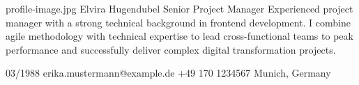 \documentclass[11pt, a4paper]{article}
\begin{document}
\personalheaderwithimage
  {profile-image.jpg}
  {Elvira Hugendubel}
  {Senior Project Manager}
  {Experienced project manager with a strong technical background in
   frontend development. I combine agile methodology with technical
   expertise to lead cross-functional teams to peak performance and
   successfully deliver complex digital transformation projects.}

\cvcontactbar
  {03/1988}
  {erika.mustermann@example.de}
  {+49 170 1234567}
  {Munich, Germany}

\end{document}
